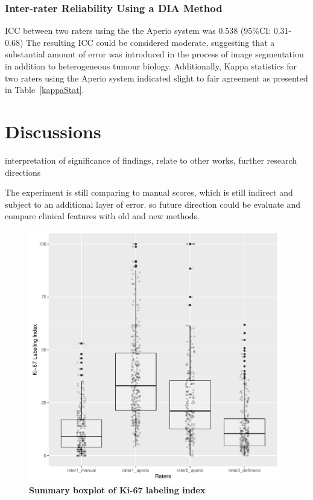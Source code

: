 \documentclass[final,3p,times]{elsarticle}
\begin{document}
\subsubsection*{Inter-rater Reliability Using a DIA Method}
ICC between two raters using the the Aperio system was 0.538 (95\%CI: 0.31-0.68) The resulting ICC could be considered moderate, suggesting that a substantial amount of error was introduced in the process of image segmentation in addition to heterogeneous tumour biology. \cite{Cicchetti1994} Additionally, Kappa statistics for two raters using the Aperio system indicated slight to fair agreement as presented in Table~\ref{kappaStat}. \cite{Landis1977}


\section*{Discussions}
interpretation of significance of findings, relate to other works, further research directions


The experiment is still comparing to manual scores, which is still indirect and subject to an additional layer of error. so future direction could be evaluate and compare clinical features with old and new methods.


\printbibliography


\newpage
\begin{figure}
\includegraphics[width = 11cm]{boxplot}
\centering
\caption{{\bf Summary boxplot of Ki-67 labeling index}}
\label{boxplot}
\end{figure}
\end{document}
